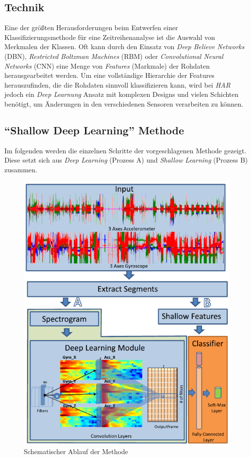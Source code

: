 \documentclass[11pt]{article}
\begin{document}
    \subsection{Technik}
    Eine der größten Herausforderungen beim Entwerfen einer Klassifizierungsmethode für eine
    Zeitreihenanalyse ist die Auswahl von Merkmalen der Klassen. Oft kann durch den Einsatz
    von \textit{Deep Believe Networks} (DBN), \textit{Restricted Boltzman Machines} (RBM) oder
    \textit{Convolutional Neural Networks} (CNN) eine Menge von \textit{Features} (Markmale) der
    Rohdaten herausgearbeitet werden. Um eine vollständige Hierarchie der Features herauszufinden,
    die die Rohdaten sinnvoll klassifizieren kann, wird bei \textit{HAR} jedoch ein
    \textit{Deep Learnung} Ansatz mit komplexen Designs und vielen Schichten benötigt, um Änderungen
    in den verschiedenen Sensoren verarbeiten zu können.
    \newpage

    \subsection{"`Shallow Deep Learning"' Methode}
    Im folgenden werden die einzelnen Schritte der vorgeschlagenen Methode gezeigt. Diese setzt
    sich aus \textit{Deep Learning} (Prozess A) und \textit{Shallow Learning} (Prozess B) zusammen.

    \begin{figure}[ht!]
        \centerings
        \includegraphics[width=12cm]{../../resources/prozess.png}
        \caption{Schematischer Ablauf der Methode}
    \end{figure}
\end{document}
